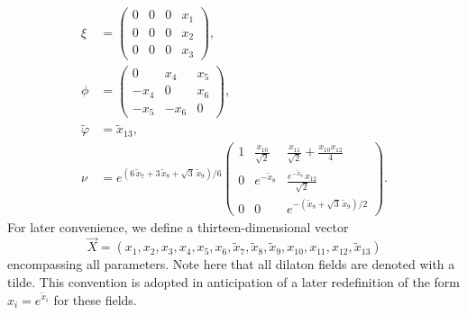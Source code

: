 \documentclass[11pt,a4paper]{article}
\begin{document}
\begin{equation}
	\begin{aligned}
		\xi &= \begin{pmatrix}
					0 & 0 & 0 & x_{1} \\
					0 & 0 & 0 & x_{2} \\
					0 & 0 & 0 & x_{3}
				\end{pmatrix}, \\[5pt]
		\phi &= \begin{pmatrix}
					0 & x_{4} & x_{5} \\
					-x_{4} & 0 & x_{6} \\
					-x_{5} & -x_{6} & 0
				\end{pmatrix}, \\[5pt]
		\tilde{\varphi} &= \tilde{x}_{13}, \\[5pt]
		\nu &= e^{(6\,\tilde{x}_{7}+3\,\tilde{x}_{8}+\sqrt{3}\,\tilde{x}_{9})/6}
				\begin{pmatrix}
					1 & \frac{x_{10}}{\sqrt{2}} & \frac{x_{11}}{\sqrt{2}} + \frac{x_{10}x_{12}}{4} \\
					0 & e^{-\tilde{x}_{8}} & \frac{e^{-\tilde{x}_{8}}\,x_{12}}{\sqrt{2}} \\
					0 & 0 & e^{-(\tilde{x}_{8}+\sqrt{3}\,\tilde{x}_{9})/2}
				\end{pmatrix}.
	\end{aligned}
\end{equation}
For later convenience, we define a thirteen-dimensional vector
\begin{equation} \label{eq:defvecX}
	\vec{X} = (x_1, x_{2}, x_{3}, x_{4}, x_{5}, x_6, \tilde{x}_7, \tilde{x}_8, \tilde{x}_9,x_{10}, x_{11}, x_{12}, \tilde{x}_{13})
\end{equation}
encompassing all parameters. Note here that all dilaton fields are denoted with a tilde. This convention is adopted in anticipation of a later redefinition of the form \( x_i = e^{\tilde{x}_i} \) for these fields. %
\end{document}
